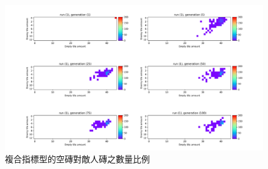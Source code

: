 \begin{figure}[H]
  \begin{center}
    \includegraphics[width=1.0\textwidth]{figures/experiments/experiment-normalized-multi-heatmap.pdf}
    \caption{複合指標型的空磚對敵人磚之數量比例} 
    \label{fig:experiment-normalized-multi-heatmap}
  \end{center}
\end{figure}








